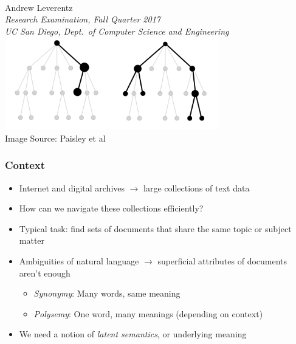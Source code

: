 \documentclass{beamer}
\begin{document}
\begin{frame}
\vspace{3em}
\begin{center}
 \\[1em]
Andrew Leverentz \\[1em]
{ \small
\emph{Research Examination, Fall Quarter 2017} \\
\emph{UC San Diego, Dept.\ of Computer Science and Engineering}} \\[2em]
\includegraphics[width=0.7\textwidth]{../figures/title_image.png} \\[1em]
{\color[rgb]{0.5,0.5,0.5} \tiny Image Source: Paisley et al \cite{paisley2015nhdp}}
\end{center}
\end{frame}

\begin{frame}
\frametitle{Context}
\begin{itemize}[<+->]
\item Internet and digital archives $\rightarrow$ large collections of text data
\item How can we navigate these collections efficiently?
\item Typical task: find sets of documents that share the same topic or subject matter
\item Ambiguities of natural language $\rightarrow$ superficial attributes of documents aren't enough
    \begin{itemize}[<+->]
    \item \emph{Synonymy}: Many words, same meaning
    \item \emph{Polysemy}: One word, many meanings (depending on context)
    \end{itemize}
\item We need a notion of \emph{latent semantics}, or underlying meaning
\end{itemize}
\end{frame}
\end{document}
